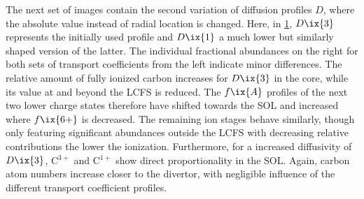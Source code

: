                 \begin{figure}[t]%
                    \centering%
                    \begin{minipage}[b]{0.48\textwidth}%
                        \centering%
                    \end{minipage}%
                    \hfill%
                    \begin{minipage}[b]{0.48\textwidth}%
                        \centering%
                    \end{minipage}%
                    \label{fig:transp_abund_103_104}%
                \end{figure}%
%
                The next set of images contain the second variation of diffusion profiles $D$, where the absolute value instead of radial location is changed. Here, in \cref{fig:transp_abund_103_104}, $D\ix{3}$ represents the initially used profile and $D\ix{1}$ a much lower but similarly shaped version of the latter. The individual fractional abundances on the right for both sets of transport coefficients from the left indicate minor differences. The relative amount of fully ionized carbon increases for $D\ix{3}$ in the core, while its value at and beyond the LCFS is reduced. The $f\ix{A}$ profiles of the next two lower charge states therefore have shifted towards the SOL and increased where $f\ix{6+}$ is decreased. The remaining ion stages behave similarly, though only featuring significant abundances outside the LCFS with decreasing relative contributions the lower the ionization. Furthermore, for a increased diffusivity of $D\ix{3}$, C$^{3+}$ and C$^{1+}$ show direct proportionality in the SOL. Again, carbon atom numbers increase closer to the divertor, with negligible influence of the different transport coefficient profiles.\\%
